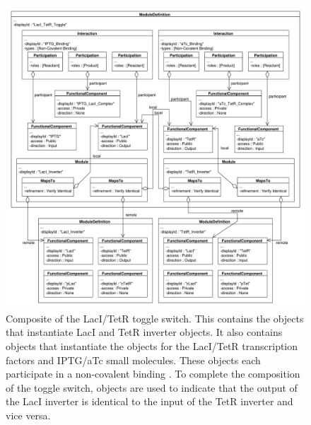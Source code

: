 \begin{figure}[ht]
\begin{center}
\includegraphics[width=\textwidth]{example_uml/toggle_4}
\caption[]{Composite  of the LacI/TetR toggle switch. This  contains the  objects that instantiate LacI and TetR inverter  objects. It also contains  objects that instantiate the  objects for the LacI/TetR transcription factors and IPTG/aTc small molecules. These  objects each participate in a non-covalent binding . To complete the composition of the toggle switch,  objects are used to indicate that the output of the LacI inverter  is identical to the input of the TetR inverter  and vice versa.
}
\label{uml:ex_mod_def_compo}
\end{center}
\end{figure}



